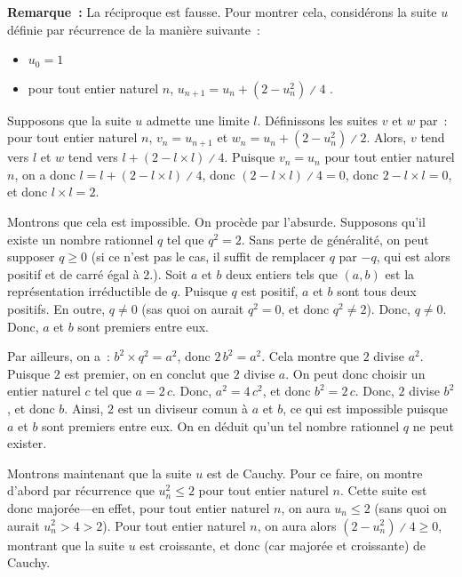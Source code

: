\begin{tcolorbox}
\textbf{Remarque :} La réciproque est fausse.
    Pour montrer cela, considérons la suite $u$ définie par récurrence de la manière suivante : 
    \begin{itemize}[nosep]
        \item $u_0 = 1$
        \item pour tout entier naturel $n$, $u_{n+1} = u_n + \left(2 - u_n^2 \right) \divslash 4$ .
    \end{itemize}
   
    Supposons que la suite $u$ admette une limite $l$. 
    Définissons les suites $v$ et $w$ par : pour tout entier naturel $n$, $v_n = u_{n+1}$ et $w_n = u_n + \left(2 - u_n^2 \right) \divslash 2$.
    Alors, $v$ tend vers $l$ et $w$ tend vers $l + (2 - l \times l) \divslash 4$. 
    Puisque $v_n = u_n$ pour tout entier naturel $n$, on a donc $l = l + (2 - l \times l) \divslash 4$, donc $(2 - l \times l) \divslash 4 = 0$, donc $2 - l \times l = 0$, et donc $l \times l = 2$.

    Montrons que cela est impossible. 
    On procède par l'absurde. 
    Supposons qu'il existe un nombre rationnel $q$ tel que $q^2 = 2$. 
    Sans perte de généralité, on peut supposer $q \geq 0$ (si ce n'est pas le cas, il suffit de remplacer $q$ par $-q$, qui est alors positif et de carré égal à $2$.).
    Soit $a$ et $b$ deux entiers tels que $(a, b)$ est la représentation irréductible de $q$. 
    Puisque $q$ est positif, $a$ et $b$ sont tous deux positifs.
    En outre, $q \neq 0$ (sas quoi on aurait $q^2 = 0$, et donc $q^2 \neq 2$). 
    Donc, $q \neq 0$. 
    Donc, $a$ et $b$ sont premiers entre eux.
    
    Par ailleurs, on a : $b^2 \times q^2 = a^2$, donc $2 \, b^2 = a^2$. 
    Cela montre que $2$ divise $a^2$. 
    Puisque $2$ est premier, on en conclut que $2$ divise $a$. 
    On peut donc choisir un entier naturel $c$ tel que $a = 2 \, c$.
    Donc, $a^2 = 4 \, c^2$, et donc $b^2 = 2 \, c$.
    Donc, $2$ divise $b^2$, et donc $b$.
    Ainsi, $2$ est un diviseur comun à $a$ et $b$, ce qui est impossible puisque $a$ et $b$ sont premiers entre eux.
    On en déduit qu'un tel nombre rationnel $q$ ne peut exister.

    \medskip

    Montrons maintenant que la suite $u$ est de Cauchy. 
    Pour ce faire, on montre d'abord par récurrence que $u_n^2 \leq 2$ pour tout entier naturel $n$. 
    Cette suite est donc majorée—en effet, pour tout entier naturel $n$, on aura $u_n \leq 2$ (sans quoi on aurait $u_n^2 > 4 > 2$). 
    Pour tout entier naturel $n$, on aura alors $\left(2 - u_n^2 \right) \divslash 4 \geq 0$, montrant que la suite $u$ est croissante, et donc (car majorée et croissante) de Cauchy.


\end{tcolorbox}
